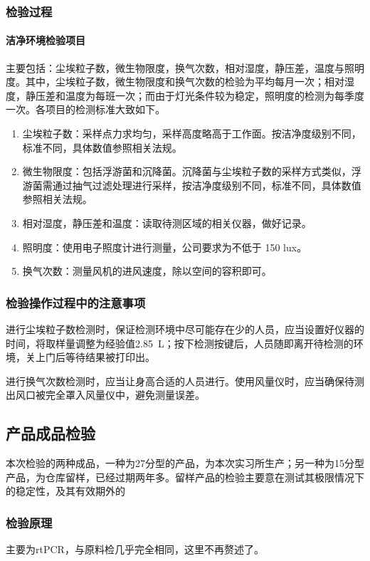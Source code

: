 \subsubsection{检验过程}
\paragraph{洁净环境检验项目} 主要包括：尘埃粒子数，微生物限度，换气次数，相对湿度，静压差，温度与照明度。其中，尘埃粒子数，微生物限度和换气次数的检验为平均每月一次；相对湿度，静压差和温度为每班一次；而由于灯光条件较为稳定，照明度的检测为每季度一次。各项目的检测标准大致如下。

\begin{enumerate}
    \item 尘埃粒子数：采样点力求均匀，采样高度略高于工作面。按洁净度级别不同，标准不同，具体数值参照相关法规。
    \item 微生物限度：包括浮游菌和沉降菌。沉降菌与尘埃粒子数的采样方式类似，浮游菌需通过抽气过滤处理进行采样，按洁净度级别不同，标准不同，具体数值参照相关法规。
    \item 相对湿度，静压差和温度：读取待测区域的相关仪器，做好记录。
    \item 照明度：使用电子照度计进行测量，公司要求为不低于 150 lux。
    \item 换气次数：测量风机的进风速度，除以空间的容积即可。
\end{enumerate}

\subsubsection{检验操作过程中的注意事项}
进行尘埃粒子数检测时，保证检测环境中尽可能存在少的人员，应当设置好仪器的时间，将取样量调整为经验值\SI{2.85}{\liter}；按下检测按键后，人员随即离开待检测的环境，关上门后等待结果被打印出。

进行换气次数检测时，应当让身高合适的人员进行。使用风量仪时，应当确保待测出风口被完全罩入风量仪中，避免测量误差。

\subsection{产品成品检验}

本次检验的两种成品，一种为27分型的产品，为本次实习所生产；另一种为15分型产品，为仓库留样，已经过期两年多。留样产品的检验主要意在测试其极限情况下的稳定性，及其有效期外的

\subsubsection{检验原理}
主要为rtPCR，与原料检几乎完全相同，这里不再赘述了。

